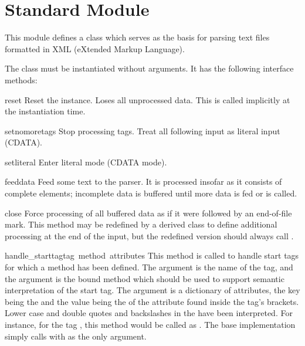 \section{Standard Module }
\label{module-xmllib}

This module defines a class  which serves as the basis 
for parsing text files formatted in XML (eXtended Markup Language).

The  class must be instantiated without arguments.  It 
has the following interface methods:

\renewcommand{\indexsubitem}{(XMLParser method)}

\begin{funcdesc}{reset}{}
Reset the instance.  Loses all unprocessed data.  This is called
implicitly at the instantiation time.
\end{funcdesc}

\begin{funcdesc}{setnomoretags}{}
Stop processing tags.  Treat all following input as literal input
(CDATA).
\end{funcdesc}

\begin{funcdesc}{setliteral}{}
Enter literal mode (CDATA mode).
\end{funcdesc}

\begin{funcdesc}{feed}{data}
Feed some text to the parser.  It is processed insofar as it consists
of complete elements; incomplete data is buffered until more data is
fed or  is called.
\end{funcdesc}

\begin{funcdesc}{close}{}
Force processing of all buffered data as if it were followed by an
end-of-file mark.  This method may be redefined by a derived class to
define additional processing at the end of the input, but the
redefined version should always call .
\end{funcdesc}

\begin{funcdesc}{handle_starttag}{tag\, method\, attributes}
This method is called to handle start tags for which a
 method has been defined.  The 
argument is the name of the tag, and the  argument is the
bound method which should be used to support semantic interpretation
of the start tag.  The  argument is a dictionary of
attributes, the key being the  and the value being the
 of the attribute found inside the tag's \code{<>} brackets.
Lower case and double quotes and backslashes in the  have
been interpreted.  For instance, for the tag
, this method would be called as
.
The base implementation simply calls  with 
as the only argument.
\end{funcdesc}

